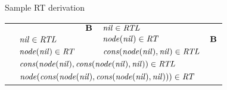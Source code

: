 \begin{wideslide}[bm=,toc=]{Sample RT derivation}
\begin{center}
\begin{tabular}{llllll}
  \onslide{2-}{             &                                 & $\bid{B}$ & $\id{nil}\in\id{RTL}$           &                       &} 
  \onslide{3-}{\\ \cline{4-4}} 
  \onslide{4-}{$\bid{B}$  & $\id{nil}\in\id{RTL}$}
  &\onslide{3-}{$\bid{R2}$             & $\mbox{\it node\/}(\mbox{\it nil\/})\in\mbox{\it RT\/}$} & \onslide{4-}{$\id{nil}\in\id{RTL}$ & $\bid{B}$} 
  \onslide{5-}{\\ \cline{2-2} \cline{4-5}}
  \onslide{6-}{$\bid{R2}$ & $\mbox{\it node\/}(\mbox{\it nil\/})\in\mbox{\it RT\/}$} & \onslide{7-}{$\bid{R1}$ & \multicolumn{2}{l}{ $\mbox{\it cons\/}(\mbox{\it node\/}(\mbox{\it nil\/}),\mbox{\it nil\/})\in\mbox{\it RTL\/}$} &} 
  \onslide{8-}{\\ \cline{2-5}}
  \onslide{9-}{$\bid{R1}$ & \multicolumn{4}{l}{$\mbox{\it cons\/}(\mbox{\it node\/}(\mbox{\it nil\/}),\mbox{\it cons\/}(\mbox{\it node\/}(\mbox{\it nil\/}),\mbox{\it nil\/}))
      \in \mbox{\it RTL\/}$}} 
  \onslide{10-}{ \\ \cline{2-5}}
  \onslide{11-}{$\bid{R2}$ & \multicolumn{4}{l}{$\mbox{\it node\/}(\mbox{\it cons\/}(\mbox{\it node\/}(\mbox{\it nil\/}),\mbox{\it cons\/}(\mbox{\it node\/}(\mbox{\it nil\/}),\mbox{\it nil\/})))\in\mbox{\it RT\/}$}}
\end{tabular}
\end{center}
\end{wideslide}




